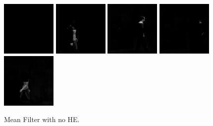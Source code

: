 \begin{subfigure}[t]{0.9\textwidth}
    \centering
    \includegraphics[scale=0.7]{figures/LASIESTA-PLAIN-MEAN/frame0}
    \hfill
    \includegraphics[scale=0.7]{figures/LASIESTA-PLAIN-MEAN/frame100}
    \hfill
    \includegraphics[scale=0.7]{figures/LASIESTA-PLAIN-MEAN/frame190}
    \hfill
    \includegraphics[scale=0.7]{figures/LASIESTA-PLAIN-MEAN/frame250}
    \hfill
    \includegraphics[scale=0.7]{figures/LASIESTA-PLAIN-MEAN/frame270}
    \caption{Mean Filter with no HE.}
\end{subfigure}%
\\ \bigskip

